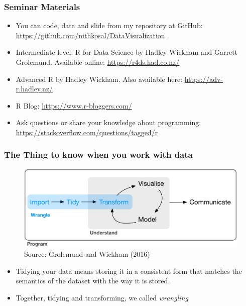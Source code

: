 \documentclass[11pt]{beamer}
\begin{document}
	\begin{frame}

	\frametitle{\bfseries Seminar Materials}
	
	\begin{itemize}
		\item You can code, data and slide from my repository at GitHub: \url{https://github.com/nithkosal/DataVisualization}
		\item Intermediate level: R for Data Science by Hadley Wickham and Garrett Grolemund. Available online:
		\url{https://r4ds.had.co.nz/}
		\item Advanced R by Hadley Wickham. Also available here:
		\url{https://adv-r.hadley.nz/}
		\item R Blog: \url{https://www.r-bloggers.com/}
		\item Ask questions or share your knowledge about programming:
		\url{https://stackoverflow.com/questions/tagged/r}
	\end{itemize}
	
	
\end{frame}

	\begin{frame}

		\frametitle{\bfseries The Thing to know when you work with data}
		
		\begin{figure}
			\centering
			\includegraphics[width=0.8\linewidth]{Figure/data-science}
			\\ 
			\footnotesize Source: Grolemund and Wickham (2016)
			\label{fig:data-science}
		\end{figure}

	\begin{itemize}
		\item Tidying your data means storing it in a consistent form that matches the semantics of the dataset with the way it is stored.
		
		\item Together, tidying and transforming, we called \textit{wrangling}

		
		
	\end{itemize}
	\end{frame}
	
\end{document}
